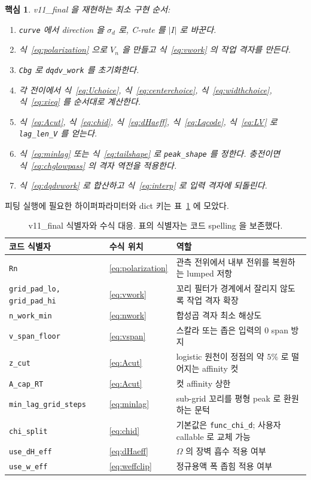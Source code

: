 \documentclass[11pt,a4paper]{article}
\newtheorem*{keybox}{핵심}
\begin{document}
\begin{keybox}
v11\_final 을 재현하는 최소 구현 순서:
\begin{enumerate}[leftmargin=2.0em,itemsep=1pt]
\item \texttt{curve} 에서 direction 을 $\sigma_d$ 로, C-rate 를 $|I|$ 로 바꾼다.
\item 식~\eqref{eq:polarization} 으로 $V_n$ 을 만들고 식~\eqref{eq:vwork} 의 작업 격자를 만든다.
\item \texttt{Cbg} 로 \texttt{dqdv\_work} 를 초기화한다.
\item 각 전이에서 식~\eqref{eq:Uchoice}, 식~\eqref{eq:centerchoice}, 식~\eqref{eq:widthchoice}, 식~\eqref{eq:xieq} 를 순서대로 계산한다.
\item 식~\eqref{eq:Acut}, 식~\eqref{eq:chid}, 식~\eqref{eq:dHaeff}, 식~\eqref{eq:Lqcode}, 식~\eqref{eq:LV} 로 \texttt{lag\_len\_V} 를 얻는다.
\item 식~\eqref{eq:minlag} 또는 식~\eqref{eq:tailshape} 로 \texttt{peak\_shape} 를 정한다. 충전이면 식~\eqref{eq:chglowpass} 의 격자 역전을 적용한다.
\item 식~\eqref{eq:dqdvwork} 로 합산하고 식~\eqref{eq:interp} 로 입력 격자에 되돌린다.
\end{enumerate}
\end{keybox}

피팅 실행에 필요한 하이퍼파라미터와 dict 키는 표~\ref{tab:codeids} 에 모았다.
\begin{table}[t]
\centering
\renewcommand{\arraystretch}{1.25}
\begin{tabular}{p{} p{} p{}}
\toprule
코드 식별자 & 수식 위치 & 역할\\
\midrule
\texttt{Rn} & \eqref{eq:polarization} & 관측 전위에서 내부 전위를 복원하는 lumped 저항\\
\texttt{grid\_pad\_lo, grid\_pad\_hi} & \eqref{eq:vwork} & 꼬리 필터가 경계에서 잘리지 않도록 작업 격자 확장\\
\texttt{n\_work\_min} & \eqref{eq:nwork} & 합성곱 격자 최소 해상도\\
\texttt{v\_span\_floor} & \eqref{eq:vspan} & 스칼라 또는 좁은 입력의 0 span 방지\\
\texttt{z\_cut} & \eqref{eq:Acut} & logistic 원천이 정점의 약 $5\%$ 로 떨어지는 affinity 컷\\
\texttt{A\_cap\_RT} & \eqref{eq:Acut} & 컷 affinity 상한\\
\texttt{min\_lag\_grid\_steps} & \eqref{eq:minlag} & sub-grid 꼬리를 평형 peak 로 환원하는 문턱\\
\texttt{chi\_split} & \eqref{eq:chid} & 기본값은 \texttt{func\_chi\_d}; 사용자 callable 로 교체 가능\\
\texttt{use\_dH\_eff} & \eqref{eq:dHaeff} & $\Omega$ 의 장벽 흡수 적용 여부\\
\texttt{use\_w\_eff} & \eqref{eq:weffclip} & 정규용액 폭 좁힘 적용 여부\\
\bottomrule
\end{tabular}
\caption{v11\_final 식별자와 수식 대응. 표의 식별자는 코드 spelling 을 보존했다.}
\label{tab:codeids}
\end{table}
\end{document}
